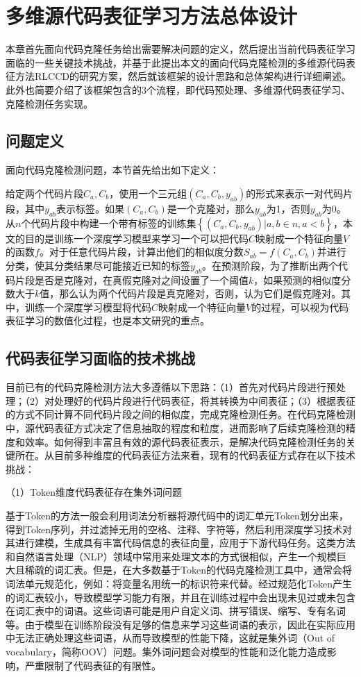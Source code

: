 \chapter{多维源代码表征学习方法总体设计}
\label{chap:design}

本章首先面向代码克隆任务给出需要解决问题的定义，然后提出当前代码表征学习面临的一些关键技术挑战，并基于此提出本文的面向代码克隆检测的多维源代码表征方法RLCCD的研究方案，然后就该框架的设计思路和总体架构进行详细阐述。此外也简要介绍了该框架包含的3个流程，即代码预处理、多维源代码表征学习、克隆检测任务实现。

\section{问题定义}
\label{sec:Definition}

面向代码克隆检测问题，本节首先给出如下定义：

给定两个代码片段$C_{a},C_{b}$，使用一个三元组$(C_{a},C_{b},y_{ab})$的形式来表示一对代码片段，其中$y_{ab}$表示标签。如果$(C_{a},C_{b})$是一个克隆对，那么$y_{ab}$为1，否则$y_{ab}$为0。从$n$个代码片段中构建一个带有标签的训练集$\left\{(C_{a},C_{b},y_{ab})|a,b \in n,a<b\right\}$，本文的目的是训练一个深度学习模型来学习一个可以把代码$C$映射成一个特征向量$V$的函数$f$。对于任意代码片段，计算出他们的相似度分数$S_{ab} = f(C_{a},C_{b})$并进行分类，使其分类结果尽可能接近已知的标签$y_{ab}$。在预测阶段，为了推断出两个代码片段是否是克隆对，在真假克隆对之间设置了一个阈值$k$，如果预测的相似度分数大于$k$值，那么认为两个代码片段是真克隆对，否则，认为它们是假克隆对。其中，训练一个深度学习模型将代码$C$映射成一个特征向量$V$的过程，可以视为代码表征学习的数值化过程，也是本文研究的重点。

\section{代码表征学习面临的技术挑战}
\label{sec:challenges}
目前已有的代码克隆检测方法大多遵循以下思路：（1）首先对代码片段进行预处理；（2）对处理好的代码片段进行代码表征，将其转换为中间表征；（3）根据表征的方式不同计算不同代码片段之间的相似度，完成克隆检测任务。在代码克隆检测中，源代码表征方式决定了信息抽取的程度和粒度，进而影响了后续克隆检测的精度和效率。如何得到丰富且有效的源代码表征表示，是解决代码克隆检测任务的关键所在。从目前多种维度的代码表征方法来看，现有的代码表征方式存在以下技术挑战：

（1）Token维度代码表征存在集外词问题

基于Token的方法一般会利用词法分析器将源代码中的词汇单元Token划分出来，得到Token序列，并过滤掉无用的空格、注释、字符等，然后利用深度学习技术对其进行建模，生成具有丰富代码信息的表征向量，应用于下游代码任务。这类方法和自然语言处理（NLP）领域中常用来处理文本的方式很相似，产生一个规模巨大且稀疏的词汇表。但是，在大多数基于Token的代码克隆检测工具中，通常会将词法单元规范化，例如：将变量名用统一的标识符来代替。经过规范化Token产生的词汇表较小，导致模型学习能力有限，并且在训练过程中会出现未见过或未包含在词汇表中的词语。这些词语可能是用户自定义词、拼写错误、缩写、专有名词等。由于模型在训练阶段没有足够的信息来学习这些词语的表示，因此在实际应用中无法正确处理这些词语，从而导致模型的性能下降，这就是集外词（Out of vocabulary，简称OOV）问题。集外词问题会对模型的性能和泛化能力造成影响，严重限制了代码表征的有限性。

